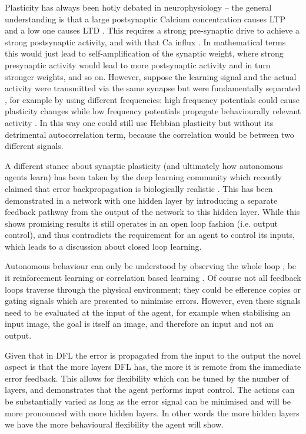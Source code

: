 \documentclass{llncs}
\begin{document}
Plasticity has always been hotly debated in neurophysiology -- the
general understanding is that a large postsynaptic Calcium
concentration causes LTP \cite{Malenka99,Bennett2000} and a low one
causes LTD \cite{Mulkey1992}. This requires a strong pre-synaptic
drive to achieve a strong postsynaptic activity, and with that Ca
influx \cite{Meunier2017}. In mathematical terms this would just lead
to self-amplification of the synaptic weight, where strong presynaptic
activity would lead to more postsynaptic activity and in turn stronger
weights, and so on. However, suppose the learning signal and the
actual activity were transmitted via the same synapse but were
fundamentally separated \cite{Lindsay2017}, for example by using
different frequencies: high frequency potentials could cause
plasticity changes while low frequency potentials propagate behaviourally
relevant activity \cite{Canolty2010}. In this way one could still use Hebbian
plasticity but without its detrimental autocorrelation term, because the
correlation would be between two different signals.

A different stance about synaptic plasticity (and ultimately how
autonomous agents learn) has been taken by the deep learning community
which recently claimed that error backpropagation is biologically
realistic \cite{Lillicrap2016,Roelfsema2018}. This has been
demonstrated in a network with one hidden layer by introducing a
separate feedback pathway from the output of the network to this
hidden layer. While this shows promising results it still operates in
an open loop fashion (i.e. output control), and thus contradicts the
requirement for an agent to control its inputs, which leads to a
discussion about closed loop learning.

Autonomous behaviour can only be understood by observing the whole
loop \cite{Porr2005kyb}, be it reinforcement learning \cite{Sutton98}
or correlation based learning \cite{Verschure91}. Of course not all
feedback loops traverse through the physical environment; they could
be efference copies \cite{Uexkuell26,Graesser86} or gating signals
which are presented to minimise errors. However, even these signals
need to be evaluated at the input of the agent, for example when
stabilising an input image, the goal is itself an image, and therefore
an input and not an output.

Given that in DFL the error is propagated from the input to the output
the novel aspect is that the more layers DFL has, the more it is remote
from the immediate error feedback. This allows for flexibility which
can be tuned by the number of layers, and demonstrates that the agent
performs input control. The actions can be substantially varied as long as
the error signal can be minimised and will be more pronounced with
more hidden layers. In other words the more hidden layers we have the
more behavioural flexibility the agent will show.




\end{document}
